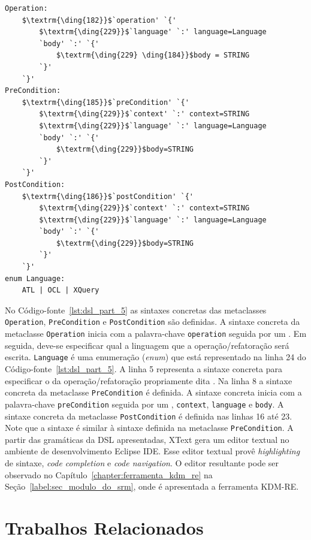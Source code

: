 \begin{lstlisting}[language=Xtext, frame=single, basicstyle=\scriptsize, mathescape=true, label={lst:dsl_part_5}, caption={Gramática da DSL - parte 5}]
Operation: 
	$\textrm{\ding{182}}$`operation' `{'
		$\textrm{\ding{229}}$`language' `:' language=Language
		`body' `:' `{'
			$\textrm{\ding{229} \ding{184}}$body = STRING
		`}'
	`}'
PreCondition: 
	$\textrm{\ding{185}}$`preCondition' `{'
		$\textrm{\ding{229}}$`context' `:' context=STRING
		$\textrm{\ding{229}}$`language' `:' language=Language
		`body' `:' `{' 
			$\textrm{\ding{229}}$body=STRING	
		`}'
	`}'
PostCondition: 
	$\textrm{\ding{186}}$`postCondition' `{'
		$\textrm{\ding{229}}$`context' `:' context=STRING
		$\textrm{\ding{229}}$`language' `:' language=Language
		`body' `:' `{' 
			$\textrm{\ding{229}}$body=STRING	
		`}'
	`}'
enum Language: 
	ATL | OCL | XQuery
\end{lstlisting}

No Código-fonte~\ref{lst:dsl_part_5} as sintaxes concretas das metaclasses \texttt{Operation}, \texttt{PreCondition} e \texttt{PostCondition} são definidas. A sintaxe concreta da metaclasse \texttt{Operation} inicia com a palavra-chave \texttt{operation} seguida por um \aspas{\{}. Em seguida, deve-se especificar qual a linguagem que a operação/refatoração será escrita. \texttt{Language} é uma enumeração (\textit{enum}) que está representado na linha 24 do Código-fonte~\ref{lst:dsl_part_5}. A linha 5 representa a sintaxe concreta para especificar o  da operação/refatoração propriamente dita . Na linha 8 a sintaxe concreta da metaclasse \texttt{PreCondition} é definida. A sintaxe concreta inicia com a palavra-chave \texttt{preCondition} seguida por um \aspas{\{}, \texttt{context}, \texttt{language} e \texttt{body}. A sintaxe concreta da metaclasse \texttt{PostCondition} é definida nas linhas 16 até 23. Note que a sintaxe é similar à sintaxe definida na metaclasse \texttt{PreCondition}. A partir das gramáticas da DSL apresentadas, XText gera um editor textual no ambiente de desenvolvimento Eclipse IDE. Esse editor textual provê \textit{highlighting} de sintaxe, \textit{code completion} e \textit{code navigation}. O editor resultante pode ser observado no Capítulo~\ref{chapter:ferramenta_kdm_re} na Seção~\ref{label:sec_modulo_do_srm}, onde é apresentada a ferramenta KDM-RE.


\section{Trabalhos Relacionados}\label{sec:trabalhos_relacionais_SRM}


